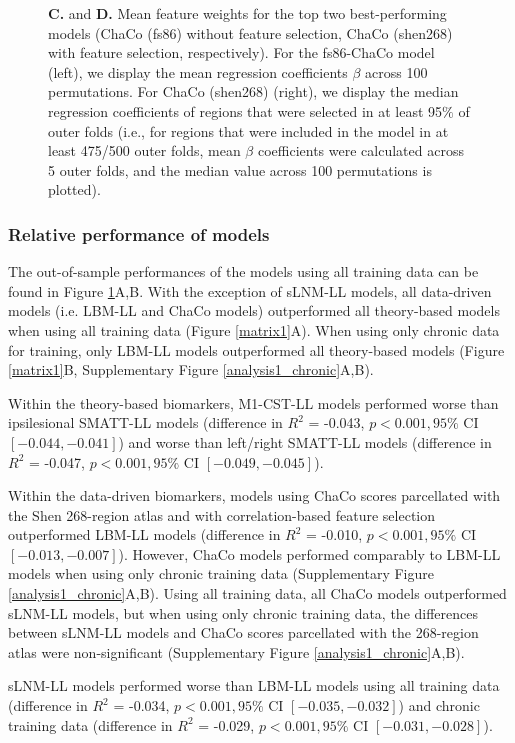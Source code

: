 \documentclass[10pt]{article}
\begin{document}
\begin{figure}[htp]
{\textbf{C.} and \textbf{D.} Mean feature weights for the top two best-performing models (ChaCo (fs86) without feature selection, ChaCo (shen268) with feature selection, respectively). For the fs86-ChaCo model (left), we display the mean regression coefficients  $\beta$ across 100 permutations. For ChaCo (shen268) (right), we display the median regression coefficients of regions that were selected in at least 95$\%$ of outer folds (i.e., for regions that were included in the model in at least 475/500 outer folds, mean $\beta$ coefficients were calculated across 5 outer folds, and the median value across 100 permutations is plotted). }
\label{analysis1}
\end{figure}

\subsubsection*{Relative performance of models}
The out-of-sample performances of the models using all training data can be found in Figure \ref{analysis1}A,B. With the exception of sLNM-LL models, all data-driven models (i.e. LBM-LL and ChaCo models) outperformed all theory-based models  when using all training data (Figure \ref{matrix1}A). When using only chronic data for training, only LBM-LL models outperformed all theory-based models (Figure \ref{matrix1}B, Supplementary Figure \ref{analysis1_chronic}A,B).

 Within the theory-based biomarkers, M1-CST-LL models performed worse than ipsilesional SMATT-LL models (difference in $R^2$ = -0.043, $p < 0.001, 95\%$ CI $[-0.044, -0.041]$) and worse than left/right SMATT-LL models (difference in $R^2$ = -0.047, $p < 0.001, 95\%$ CI $[-0.049, -0.045]$). 

Within the data-driven biomarkers, models using ChaCo scores parcellated with the Shen 268-region atlas and with correlation-based feature selection outperformed LBM-LL models (difference in $R^2$ = -0.010, $p < 0.001, 95\%$ CI $[-0.013, -0.007]$). However, ChaCo models performed comparably to LBM-LL models when using only chronic training data (Supplementary Figure \ref{analysis1_chronic}A,B). 
Using all training data, all ChaCo models outperformed sLNM-LL models, but when using only chronic training data, the differences between sLNM-LL models and ChaCo scores parcellated with the 268-region atlas were non-significant (Supplementary Figure \ref{analysis1_chronic}A,B).

sLNM-LL models performed worse than LBM-LL models using all training data (difference in $R^2$ = -0.034, $p < 0.001, 95\%$ CI $[-0.035, -0.032]$) and chronic training data (difference in $R^2$ = -0.029, $p < 0.001, 95\%$ CI $[-0.031, -0.028]$). 
\end{document}
